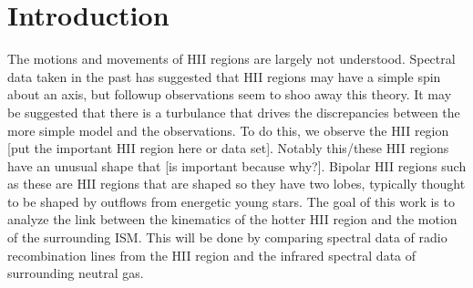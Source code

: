 \documentclass{article}
\begin{document}
\section{Introduction}

The motions and movements of HII regions are largely not understood. Spectral data taken in the past has suggested that HII regions may have a simple spin about an axis, but followup observations seem to shoo away this theory. It may be suggested that there is a turbulance that drives the discrepancies between the more simple model and the observations. To do this, we observe the HII region [put the important HII region here or data set]. Notably this/these HII regions have an unusual shape that [is important because why?]. Bipolar HII regions such as these are HII regions that are shaped so they have two lobes, typically thought to be shaped by outflows from energetic young stars. The goal of this work is to analyze the link between the kinematics of the hotter HII region and the motion of the surrounding ISM. This will be done by comparing spectral data of radio recombination lines from the HII region and the infrared spectral data of surrounding neutral gas. 
\end{document}
